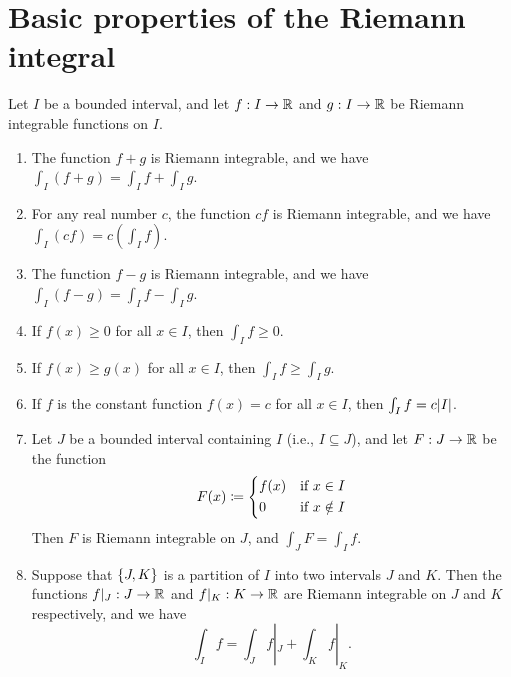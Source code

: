 \section{Basic properties of the Riemann integral}\label{i:sec:11.4}

\begin{thm}\label{i:11.4.1}
  Let \(I\) be a bounded interval, and let \(f : I \to \mathbb{R}\) and \(g : I \to \mathbb{R}\) be Riemann integrable functions on \(I\).
  \begin{enumerate}
    \item\label{i:11.4.1.a} The function \(f + g\) is Riemann integrable, and we have \(\int_I (f + g) = \int_I f + \int_I g\).
    \item\label{i:11.4.1.b} For any real number \(c\), the function \(cf\) is Riemann integrable, and we have \(\int_I (cf) = c(\int_I f)\).
    \item\label{i:11.4.1.c} The function \(f - g\) is Riemann integrable, and we have \(\int_I (f - g) = \int_I f - \int_I g\).
    \item\label{i:11.4.1.d} If \(f(x) \geq 0\) for all \(x \in I\), then \(\int_I f \geq 0\).
    \item\label{i:11.4.1.e} If \(f(x) \geq g(x)\) for all \(x \in I\), then \(\int_I f \geq \int_I g\).
    \item\label{i:11.4.1.f} If \(f\) is the constant function \(f(x) = c\) for all \(x \in I\), then \(\int_I f = c \abs{I}\).
    \item\label{i:11.4.1.g} Let \(J\) be a bounded interval containing \(I\) (i.e., \(I \subseteq J\)), and let \(F : J \to \mathbb{R}\) be the function
    \[
      F(x) \coloneqq \begin{dcases}
        f(x) & \text{if } x \in I    \\
        0    & \text{if } x \notin I \\
      \end{dcases}
    \]
    Then \(F\) is Riemann integrable on \(J\), and \(\int_J F = \int_I f\).
    \item\label{i:11.4.1.h} Suppose that \(\left\lbrace J, K\right\rbrace\) is a partition of \(I\) into two intervals \(J\) and \(K\).
    Then the functions \(f|_J : J \to \mathbb{R}\) and \(f|_K : K \to \mathbb{R}\) are Riemann integrable on \(J\) and \(K\) respectively, and we have
    \[
      \int_I f = \int_J f|_J + \int_K f|_K.
    \]
  \end{enumerate}
\end{thm}

